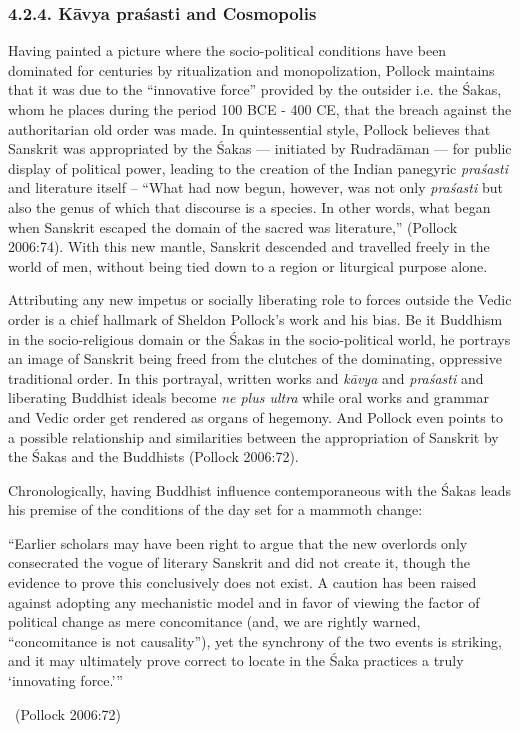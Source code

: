 \subsubsection*{4.2.4. Kāvya praśasti and Cosmopolis}

Having painted a picture where the socio-political conditions have been dominated for centuries by ritualization and monopolization, Pollock maintains that it was due to the “innovative force” provided by the outsider i.e. the Śakas, whom he places during the period 100 BCE - 400 CE, that the breach against the authoritarian old order was made. In quintessential style, Pollock believes that Sanskrit was appropriated by the Śakas — initiated by Rudradāman — for public display of political power, leading to the creation of the Indian panegyric \textit{praśasti} and literature itself – “What had now begun, however, was not only \textit{praśasti} but also the genus of which that discourse is a species. In other words, what began when Sanskrit escaped the domain of the sacred was literature,” (Pollock 2006:74). With this new mantle, Sanskrit descended and travelled freely in the world of men, without being tied down to a region or liturgical purpose alone.

Attributing any new impetus or socially liberating role to forces outside the Vedic order is a chief hallmark of Sheldon Pollock’s work and his bias. Be it Buddhism in the socio-religious domain or the Śakas in the socio-political world, he portrays an image of Sanskrit being freed from the clutches of the dominating, oppressive traditional order. In this portrayal, written works and \textit{kāvya} and \textit{praśasti} and liberating Buddhist ideals become \textit{ne plus ultra} while oral works and grammar and Vedic order get rendered as organs of hegemony. And Pollock even points to a possible relationship and similarities between the appropriation of Sanskrit by the Śakas and the Buddhists (Pollock 2006:72).

Chronologically, having Buddhist influence contemporaneous with the Śakas leads his premise of the conditions of the day set for a mammoth change:

\begin{myquote}
“Earlier scholars may have been right to argue that the new overlords only consecrated the vogue of literary Sanskrit and did not create it, though the evidence to prove this conclusively does not exist. A caution has been raised against adopting any mechanistic model and in favor of viewing the factor of political change as mere concomitance (and, we are rightly warned, “concomitance is not causality”), yet the synchrony of the two events is striking, and it may ultimately prove correct to locate in the Śaka practices a truly ‘innovating force.’” 

~\hfill (Pollock 2006:72)
\end{myquote}

